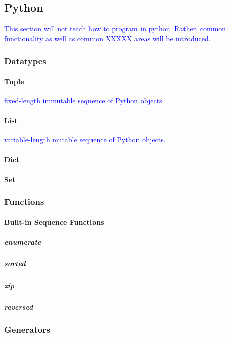 \subsection{Python}

\textcolor{blue}{This section will not teach how to program in python. Rather, common functionality as well as common XXXXX areas will be introduced.}

\subsubsection{Datatypes}

\paragraph{Tuple}

\textcolor{blue}{fixed-length immutable sequence of Python objects.}

\paragraph{List}

\textcolor{blue}{variable-length mutable sequence of Python objects.}

\paragraph{Dict}

\paragraph{Set}

\subsubsection{Functions}

\paragraph{Built-in Sequence Functions}

\subparagraph{enumerate}

\subparagraph{sorted}

\subparagraph{zip}

\subparagraph{reversed}

\subsubsection{Generators}

